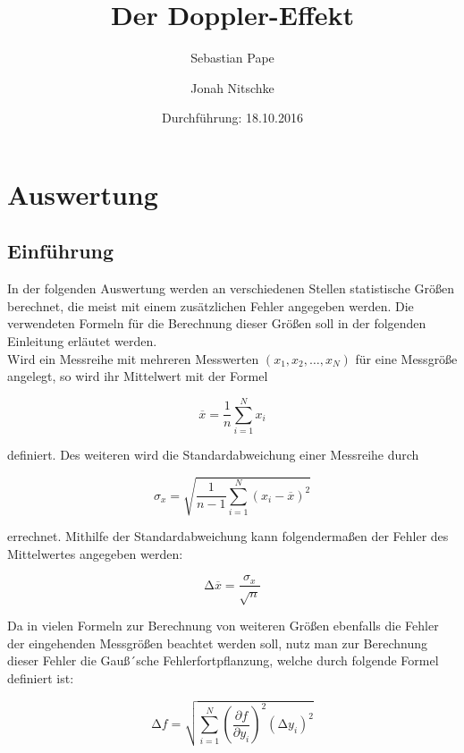 

\subject{104}
\title{Der Doppler-Effekt}
\author{Sebastian Pape \and Jonah Nitschke}
\date{Durchführung: 18.10.2016}



\maketitle



\section{Auswertung}
\subsection{Einführung}
In der folgenden Auswertung werden an verschiedenen Stellen statistische Größen berechnet,
die meist mit einem zusätzlichen Fehler angegeben werden. Die verwendeten Formeln für die
Berechnung dieser Größen soll in der folgenden Einleitung erläutet werden.\\
Wird ein Messreihe mit mehreren Messwerten $(x_1, x_2, \ldots , x_N)$ für eine Messgröße angelegt,
so wird ihr Mittelwert mit der Formel

\begin{equation}
  \overline{x} = \frac{1}{n} \sum_{i=1}^N x_i
\end{equation}

definiert. Des weiteren wird die Standardabweichung einer Messreihe durch

\begin{equation}
  \sigma_x = \sqrt{\frac{1}{n - 1} \sum_{i=1}^N (x_i - \overline{x})^2}
\end{equation}

errechnet. Mithilfe der Standardabweichung kann folgendermaßen der Fehler des Mittelwertes
angegeben werden:

\begin{equation}
  \increment \overline{x} = \frac{\sigma_x}{\sqrt{n}}
\end{equation}

Da in vielen Formeln zur Berechnung von weiteren Größen ebenfalls die Fehler der eingehenden
Messgrößen beachtet werden soll, nutz man zur Berechnung dieser Fehler die Gauß´sche
Fehlerfortpflanzung, welche durch folgende Formel definiert ist:

\begin{equation}
  \increment f = \sqrt{ \sum_{i=1}^N (\frac{\partial f}{\partial y_i})^2 (\increment y_i)^2}
\end{equation}

